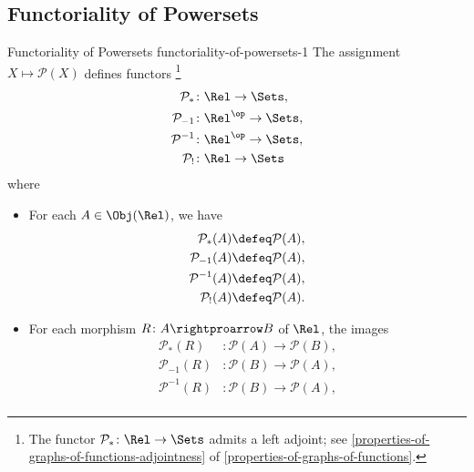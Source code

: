 \subsection{Functoriality of Powersets}\label{subsection-functoriality-of-powersets}
\begin{proposition}{Functoriality of Powersets \rmI}{functoriality-of-powersets-1}%
    The assignment $X\mapsto\mathcal{P}(X)$ defines functors%
    \footnote{%
        The functor $\mathcal{P}_{*}\colon\Rel\to\Sets$ admits a left adjoint; see \cref{properties-of-graphs-of-functions-adjointness} of \cref{properties-of-graphs-of-functions}.
        \par\vspace*{-1.75\baselineskip}
    }%
    \begin{align*}
        \mathcal{P}_{*}  &\colon \Rel       \to \Sets,\\%
        \mathcal{P}_{-1} &\colon \Rel^{\op} \to \Sets,\\%
        \mathcal{P}^{-1} &\colon \Rel^{\op} \to \Sets,\\%
        \mathcal{P}_{!}  &\colon \Rel       \to \Sets%
    \end{align*}
    where
    \begin{itemize}
        \item{}For each $A\in\Obj(\Rel)$, we have
            \begin{align*}
                \mathcal{P}_{*}(A)  &\defeq \mathcal{P}(A),\\%
                \mathcal{P}_{-1}(A) &\defeq \mathcal{P}(A),\\%
                \mathcal{P}^{-1}(A) &\defeq \mathcal{P}(A),\\%
                \mathcal{P}_{!}(A)  &\defeq \mathcal{P}(A).%
            \end{align*}
        \item{}For each morphism $R\colon A\rightproarrow B$ of $\Rel$, the images
            \begin{align*}
                \mathcal{P}_{*}(R)  &\colon \mathcal{P}(A) \to \mathcal{P}(B),\\%
                \mathcal{P}_{-1}(R) &\colon \mathcal{P}(B) \to \mathcal{P}(A),\\%
                \mathcal{P}^{-1}(R) &\colon \mathcal{P}(B) \to \mathcal{P}(A),\\%

\end{align*}
\end{itemize}
\end{proposition}

